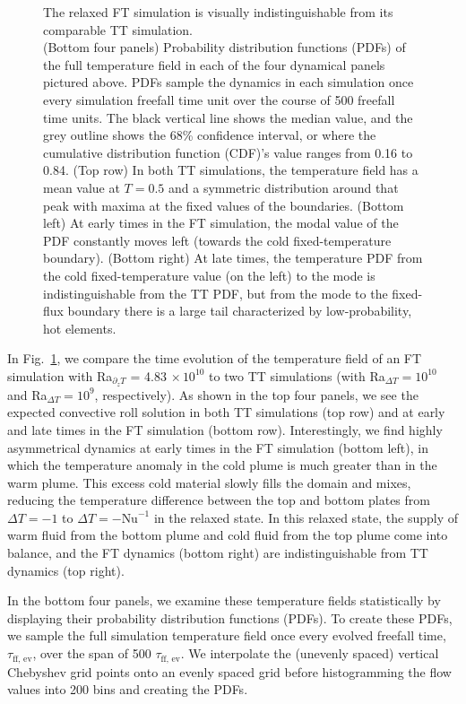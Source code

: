 \documentclass[aps, pre, onecolumn, nofootinbib, notitlepage, groupedaddress, amsfonts, amssymb, amsmath, longbibliography, superscriptaddress]{revtex4-1}
\newcommand{\ea}[1]{{\color{red} #1}}
\begin{document}
\begin{figure}[p!]
{	The relaxed FT simulation is visually indistinguishable from its comparable TT simulation.
\\	
	(Bottom four panels) Probability distribution functions (PDFs) of the full temperature field in each of the four dynamical panels pictured above.
	PDFs sample the dynamics in each simulation once every simulation freefall time unit over the course of 500 freefall time units.
	The black vertical line shows the median value, and the grey outline shows the 68\% confidence interval, or where the cumulative distribution function (CDF)'s value ranges from 0.16 to 0.84.
	(Top row) In both TT simulations, the temperature field has a mean value at $T = 0.5$ and a symmetric distribution around that peak with maxima at the fixed values of the boundaries. 
	(Bottom left) At early times in the FT simulation, the modal value of the PDF constantly moves left (towards the cold fixed-temperature boundary).
	(Bottom right) At late times, the temperature PDF from the cold fixed-temperature value (on the left) to the mode is indistinguishable from the TT PDF, but from the mode to the fixed-flux boundary there is a large tail characterized by low-probability, hot elements.
	\label{fig:rbc_evolution_dynamics} }
\end{figure}

In Fig.~\ref{fig:rbc_evolution_dynamics}, we compare the time evolution of the temperature field of an FT simulation with Ra$_{\partial_z T}$ = 4.83$\,\times 10^{10}$ to two TT simulations (with Ra$_{\Delta T} = 10^{10}$ and Ra$_{\Delta T} = 10^9$, respectively).
As shown in the top four panels, we see the expected convective roll solution in both TT simulations (top row) and at early and late times in the FT simulation (bottom row).
Interestingly, we find highly asymmetrical dynamics at early times in the FT simulation (bottom left), in which the temperature anomaly in the cold plume is much greater than in the warm plume.
This excess cold material slowly fills the domain and mixes, reducing the temperature difference between the top and bottom plates from $\Delta T = -1$ to $\Delta T = -\text{Nu}^{-1}$ in the relaxed state.
In this relaxed state, the supply of warm fluid from the bottom plume and cold fluid from the top plume come into balance, and the FT dynamics (bottom right) are indistinguishable from TT dynamics (top right).

In the bottom four panels, we examine these temperature fields statistically by displaying their probability distribution functions (PDFs).
To create these PDFs, we sample the full simulation temperature field once every \ea{evolved} freefall time, \ea{$\tau_{\text{ff, ev}}$}, over the span of 500\ea{$\tau_{\text{ff, ev}}$}.
We interpolate the (unevenly spaced) vertical Chebyshev grid points onto an evenly spaced grid before histogramming the flow values into 200 bins and creating the PDFs.
\end{document}
